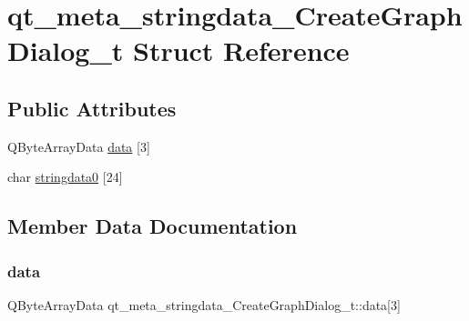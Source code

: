 \hypertarget{structqt__meta__stringdata___create_graph_dialog__t}{}\section{qt\+\_\+meta\+\_\+stringdata\+\_\+\+Create\+Graph\+Dialog\+\_\+t Struct Reference}
\label{structqt__meta__stringdata___create_graph_dialog__t}
\subsection*{Public Attributes}
\begin{DoxyCompactItemize}
\item 
Q\+Byte\+Array\+Data \mbox{\hyperlink{structqt__meta__stringdata___create_graph_dialog__t_ae4b81a9731e4f013e8185d1e1a2de98e}{data}} \mbox{[}3\mbox{]}
\item 
char \mbox{\hyperlink{structqt__meta__stringdata___create_graph_dialog__t_a75769d17a904c90fbc7135cd5b42a24e}{stringdata0}} \mbox{[}24\mbox{]}
\end{DoxyCompactItemize}


\subsection{Member Data Documentation}
\mbox{\label{structqt__meta__stringdata___create_graph_dialog__t_ae4b81a9731e4f013e8185d1e1a2de98e}} 
\subsubsection{\texorpdfstring{data}{data}}
{\footnotesize\ttfamily Q\+Byte\+Array\+Data qt\+\_\+meta\+\_\+stringdata\+\_\+\+Create\+Graph\+Dialog\+\_\+t\+::data\mbox{[}3\mbox{]}}

\mbox{\label{structqt__meta__stringdata___create_graph_dialog__t_a75769d17a904c90fbc7135cd5b42a24e}} 

